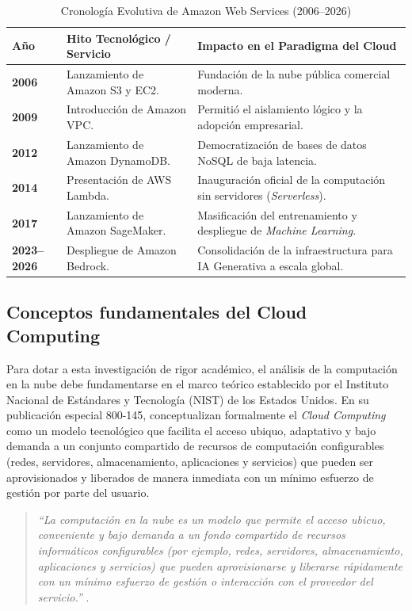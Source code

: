 \documentclass[12pt,a4paper]{article}
\begin{document}
\vspace{0.3cm}
\begin{table}[H]
\centering
\caption{Cronología Evolutiva de Amazon Web Services (2006–2026)}
\label{tab:cronologia_aws}
\begin{tabular}{ l p{5cm} p{6.5cm} }
\toprule
\textbf{Año} & \textbf{Hito Tecnológico / Servicio} & \textbf{Impacto en el Paradigma del Cloud} \\
\midrule
\textbf{2006} & Lanzamiento de Amazon S3 y EC2. & Fundación de la nube pública comercial moderna. \\
\textbf{2009} & Introducción de Amazon VPC. & Permitió el aislamiento lógico y la adopción empresarial. \\
\textbf{2012} & Lanzamiento de Amazon DynamoDB. & Democratización de bases de datos NoSQL de baja latencia. \\
\textbf{2014} & Presentación de AWS Lambda. & Inauguración oficial de la computación sin servidores (\textit{Serverless}). \\
\textbf{2017} & Lanzamiento de Amazon SageMaker. & Masificación del entrenamiento y despliegue de \textit{Machine Learning}. \\
\textbf{2023--2026} & Despliegue de Amazon Bedrock. & Consolidación de la infraestructura para IA Generativa a escala global. \\
\bottomrule
\end{tabular}
\end{table}
\vspace{0.3cm}
\subsection{Conceptos fundamentales del Cloud Computing}
Para dotar a esta investigación de rigor académico, el análisis de la computación en la nube debe fundamentarse en el marco teórico establecido por el Instituto Nacional de Estándares y Tecnología (NIST) de los Estados Unidos. En su publicación especial 800-145, \textcite{mell2011} conceptualizan formalmente el \textit{Cloud Computing} como un modelo tecnológico que facilita el acceso ubiquo, adaptativo y bajo demanda a un conjunto compartido de recursos de computación configurables (redes, servidores, almacenamiento, aplicaciones y servicios) que pueden ser aprovisionados y liberados de manera inmediata con un mínimo esfuerzo de gestión por parte del usuario.

\vspace{0.2cm}
\begin{quote}
\small
\textit{\enquote{La computación en la nube es un modelo que permite el acceso ubicuo, conveniente y bajo demanda a un fondo compartido de recursos informáticos configurables (por ejemplo, redes, servidores, almacenamiento, aplicaciones y servicios) que pueden aprovisionarse y liberarse rápidamente con un mínimo esfuerzo de gestión o interacción con el proveedor del servicio.}} \parencite[p.~2]{mell2011}.
\end{quote}
\vspace{0.2cm}
\end{document}

